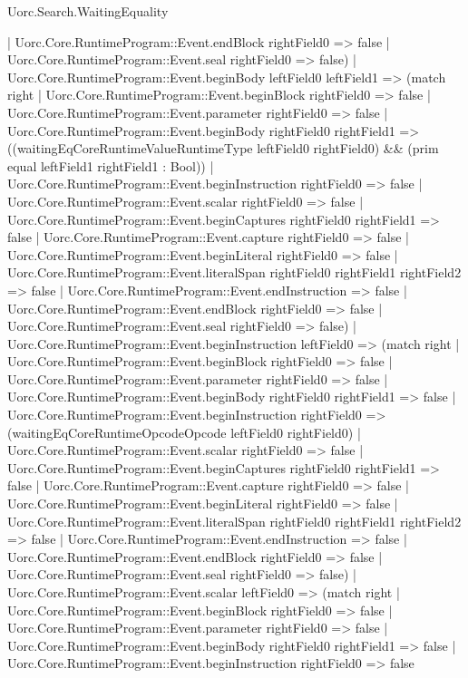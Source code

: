 \begin{lexlean}{Uorc.Search.WaitingEquality}
\begin{semanticmodule}
{      | Uorc.Core.RuntimeProgram::Event.endBlock rightField0 => false
      | Uorc.Core.RuntimeProgram::Event.seal rightField0 => false)
    | Uorc.Core.RuntimeProgram::Event.beginBody leftField0 leftField1 => (match right
      | Uorc.Core.RuntimeProgram::Event.beginBlock rightField0 => false
      | Uorc.Core.RuntimeProgram::Event.parameter rightField0 => false
      | Uorc.Core.RuntimeProgram::Event.beginBody rightField0 rightField1 => ((waitingEqCoreRuntimeValueRuntimeType leftField0 rightField0) && (prim equal leftField1 rightField1 : Bool))
      | Uorc.Core.RuntimeProgram::Event.beginInstruction rightField0 => false
      | Uorc.Core.RuntimeProgram::Event.scalar rightField0 => false
      | Uorc.Core.RuntimeProgram::Event.beginCaptures rightField0 rightField1 => false
      | Uorc.Core.RuntimeProgram::Event.capture rightField0 => false
      | Uorc.Core.RuntimeProgram::Event.beginLiteral rightField0 => false
      | Uorc.Core.RuntimeProgram::Event.literalSpan rightField0 rightField1 rightField2 => false
      | Uorc.Core.RuntimeProgram::Event.endInstruction => false
      | Uorc.Core.RuntimeProgram::Event.endBlock rightField0 => false
      | Uorc.Core.RuntimeProgram::Event.seal rightField0 => false)
    | Uorc.Core.RuntimeProgram::Event.beginInstruction leftField0 => (match right
      | Uorc.Core.RuntimeProgram::Event.beginBlock rightField0 => false
      | Uorc.Core.RuntimeProgram::Event.parameter rightField0 => false
      | Uorc.Core.RuntimeProgram::Event.beginBody rightField0 rightField1 => false
      | Uorc.Core.RuntimeProgram::Event.beginInstruction rightField0 => (waitingEqCoreRuntimeOpcodeOpcode leftField0 rightField0)
      | Uorc.Core.RuntimeProgram::Event.scalar rightField0 => false
      | Uorc.Core.RuntimeProgram::Event.beginCaptures rightField0 rightField1 => false
      | Uorc.Core.RuntimeProgram::Event.capture rightField0 => false
      | Uorc.Core.RuntimeProgram::Event.beginLiteral rightField0 => false
      | Uorc.Core.RuntimeProgram::Event.literalSpan rightField0 rightField1 rightField2 => false
      | Uorc.Core.RuntimeProgram::Event.endInstruction => false
      | Uorc.Core.RuntimeProgram::Event.endBlock rightField0 => false
      | Uorc.Core.RuntimeProgram::Event.seal rightField0 => false)
    | Uorc.Core.RuntimeProgram::Event.scalar leftField0 => (match right
      | Uorc.Core.RuntimeProgram::Event.beginBlock rightField0 => false
      | Uorc.Core.RuntimeProgram::Event.parameter rightField0 => false
      | Uorc.Core.RuntimeProgram::Event.beginBody rightField0 rightField1 => false
      | Uorc.Core.RuntimeProgram::Event.beginInstruction rightField0 => false
}
\end{semanticmodule}
\end{lexlean}
